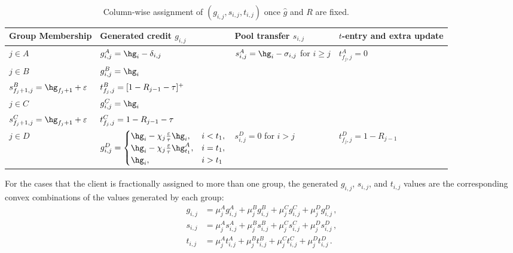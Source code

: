 \begin{table}[H]
\centering
\small
\caption{Column-wise assignment of $(g_{i,j},s_{i,j},t_{i,j})$ once $\hat g$ and $R$ are fixed.}
\label{tab:general-case-procedure}
\renewcommand{\arraystretch}{1.25}
\begin{tabularx}{\textwidth}{@{}>{\RaggedRight\arraybackslash}p{}>{\RaggedRight\arraybackslash}p{}>{\RaggedRight\arraybackslash}p{}>{\RaggedRight\arraybackslash}X@{}}
\toprule
Group Membership & Generated credit $g_{i,j}$ & Pool transfer $s_{i,j}$ & $t$-entry and extra update \\
\midrule
$j\in A$ &
$g_{i,j}^A = \hg_i-\delta_{i,j}$ &
$s_{i,j}^A = \hg_i-\sigma_{i,j}$ for $i\ge j$ &
$t_{f_j,j}^A = 0$ \\
\addlinespace[0.4em]
$j\in B$ &
$g_{i,j}^B = \hg_i$ &
\begin{tabular}{@{}l@{}}
    $s_{i,j}^B = \hg_i$ for $i>j$ \\
    $s_{f_j+1,j}^B=\hg_{f_j+1} + \Mcoeffmone$
\end{tabular}
& $t_{f_{j},j}^B= [1-R_{j-1} - \tau]^+$
\\
\addlinespace[0.4em]
$j\in C$ &
$g_{i,j}^C = \hg_i$ &
\begin{tabular}{@{}l@{}}
    $s_{i,j}^C = \hg_i$ for $i>j$ \\
    $s_{f_j+1,j}^C=\hg_{f_j+1} + \Mcoeffmone$
\end{tabular}
&$t_{f_{j},j}^C=1-R_{j-1} - \tau$
\\
\addlinespace[0.4em]
$j\in D$ &
$g_{i,j}^D = \begin{cases}
    \hg_i - \chi_j\Mfrac\hg_i, & i<t_1,\\
    \hg_i - \chi_j\Mfrac\hg_{t_1}^A, & i=t_1,\\
    \hg_i, & i>t_1
\end{cases}$ &
$s_{i,j}^D = 0$ for $i>j$ &
$t_{f_{j},j}^D=1-R_{j-1}$
\\
\bottomrule
\end{tabularx}
\end{table}

For the cases that the client is fractionally assigned to more than one group, the generated $g_{i,j}$, $s_{i,j}$, and $t_{i,j}$ values are the corresponding convex combinations of the values generated by each group:
\begin{equation}\label{formula:fractional-assignments-convex-combination}
    \begin{aligned}
        g_{i,j} &= \mu_j^A g_{i,j}^A + \mu_j^B g_{i,j}^B + \mu_j^C g_{i,j}^C + \mu_j^D g_{i,j}^D\,,\\
        s_{i,j} &= \mu_j^A s_{i,j}^A + \mu_j^B s_{i,j}^B + \mu_j^C s_{i,j}^C + \mu_j^D s_{i,j}^D\,,\\
        t_{i,j} &= \mu_j^A t_{i,j}^A + \mu_j^B t_{i,j}^B + \mu_j^C t_{i,j}^C + \mu_j^D t_{i,j}^D\,.
    \end{aligned}
\end{equation}


